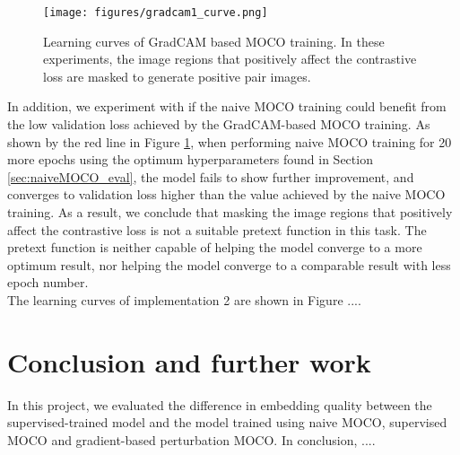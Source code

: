 \documentclass[12pt,twoside]{report}
\begin{document}
\begin{figure}
    \centering
    \texttt{[image: figures/gradcam1\_curve.png]}
    \caption{Learning curves of GradCAM based MOCO training. In these experiments, the image regions that positively affect the contrastive loss are masked to generate positive pair images. }
    \label{fig:gradcam1_curve}
\end{figure}

In addition, we experiment with if the naive MOCO training could benefit from the low validation loss achieved by the GradCAM-based MOCO training. As shown by the red line in Figure \ref{fig:gradcam1_curve}, when performing naive MOCO training for 20 more epochs using the optimum hyperparameters found in Section \ref{sec:naiveMOCO_eval}, the model fails to show further improvement, and converges to validation loss higher than the value achieved by the naive MOCO training. As a result, we conclude that masking the image regions that positively affect the contrastive loss is not a suitable pretext function in this task. The pretext function is neither capable of helping the model converge to a more optimum result, nor helping the model converge to a comparable result with less epoch number. \\

The learning curves of implementation 2 are shown in Figure .... 


\chapter{Conclusion and further work}

In this project, we evaluated the difference in embedding quality between the supervised-trained model and the model trained using naive MOCO, supervised MOCO and gradient-based perturbation MOCO. In conclusion, .... \\
\end{document}
